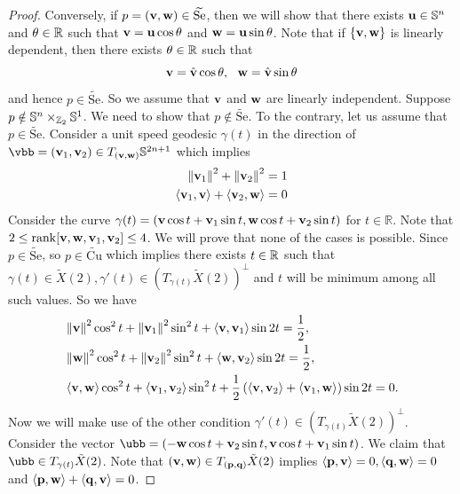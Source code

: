 \begin{proof}
	\hf Conversely, if $p = (\mathbf{v},\mathbf{w})\in \widetilde{\mathrm{Se}}$, then we will show that there exists $\mathbf{u} \in \mathbb{S}^n$ and $\theta\in \mathbb{R}$ such that $\mathbf{v} = \mathbf{u} \cos \theta$ and $\mathbf{w}=\mathbf{u}\sin \theta$. Note that if $\{\mathbf{v},\mathbf{w}\}$ is linearly dependent, then there exists $\theta\in \mathbb{R}$ such that 
	\begin{displaymath}
		 \mathbf{v} = \hat{\mathbf{v}}\cos \theta,~~ \mathbf{w} = \hat{\mathbf{v}}\sin \theta
	\end{displaymath}
	and hence $p\in \widetilde{\mathrm{Se}}$. So we assume that $\mathbf{v}$ and $\mathbf{w}$ are linearly independent. Suppose $p\notin \mathbb{S}^n\times_{\mathbb{Z}_2} \mathbb{S}^1$. We need to show that $p\notin \widetilde{\mathrm{Se}}$. To the contrary, let us assume that $p\in \widetilde{\mathrm{Se}}$. Consider a unit speed geodesic $\gamma(t)$ in the direction of $\vbb=(\vbf_1,\vbf_2)\in T_{(\vbf,\wbf)}\sbb^{2n+1}$ which implies 
	\begin{align}
		\left\|\mathbf{v}_1\right\|^2+\left\|\mathbf{v}_2\right\|^2=1 \label{eq:tangent_space_of_sphere_cond-1} \\ 
		\left\langle \mathbf{v}_1, \mathbf{v} \right\rangle + \left\langle \mathbf{v}_2, \mathbf{w} \right\rangle=0 \label{eq:tangent_space_of_sphere_cond-2}
	\end{align}
	Consider the curve $\gamma(t)=\left(\mathbf{v}\cos t+\mathbf{v}_1\sin t, \mathbf{w}\cos t+\mathbf{v}_2\sin t\right)$ for $t\in \mathbb{R}$. Note that $2\le \operatorname{rank}[\mathbf{v},\mathbf{w},\mathbf{v}_1,\mathbf{v}_2] \le 4$. We will prove that none of the cases is possible. Since $p\in \widetilde{\mathrm{Se}}$, so $p\in \widetilde{\mathrm{Cu}}$ which implies there exists $t\in \mathbb{R}$ such that $\gamma(t)\in \tilde{X}(2),\gamma'(t)\in \left(T_{\gamma(t)}\tilde{X}(2)\right)^\perp$ and $t$ will be minimum among all such values. So we have
	\begin{align}
		& \left\|\mathbf{v}\right\|^2\cos^2t+\left\|\mathbf{v}_1\right\|^2\sin^2t+\left\langle \mathbf{v}, \mathbf{v}_1 \right\rangle \sin 2t = \frac{1}{2} \label{eq:geodesic-on-X(2)-1},
		\\
		& \left\|\mathbf{w}\right\|^2\cos^2t+\left\|\mathbf{v}_2\right\|^2\sin^2t+\left\langle \mathbf{w}, \mathbf{v}_2 \right\rangle \sin 2t = \frac{1}{2}, \notag
		\\
		& \left\langle \mathbf{v}, \mathbf{w} \right\rangle\cos^2t + \left\langle \mathbf{v}_1, \mathbf{v}_2 \right\rangle\sin^2t + \frac{1}{2} \left(\left\langle \mathbf{v}, \mathbf{v}_2 \right\rangle + \left\langle \mathbf{v}_1, \mathbf{w} \right\rangle\right)\sin 2t=0\label{eq:geodesic-on-X(2)-3}. 
	\end{align}
	Now we will make use of the other condition $\gamma'(t)\in \left(T_{\gamma(t)}\tilde{X}(2)\right)^\perp$. Consider the vector $\ubb= \left(-\wbf\cos t+\vbf_2\sin t,\vbf\cos t+\vbf_1\sin t\right)$. We claim that $\ubb\in T_{\gamma(t)}\tilde{X}(2)$. Note that $(\mathbf{v},\mathbf{w})\in T_{(\mathbf{p},\mathbf{q})}\tilde{X}(2)$ implies $\left\langle \mathbf{p} ,\mathbf{v}  \right\rangle=0, \left\langle \mathbf{q} ,\mathbf{w}  \right\rangle=0$ and $\left\langle \mathbf{p} ,\mathbf{w}  \right\rangle+ \left\langle \mathbf{q} , \mathbf{v}  \right\rangle=0$. 

\end{proof}
